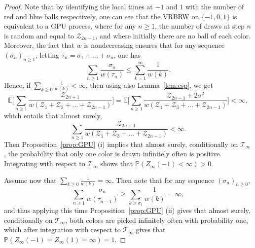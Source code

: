 \documentclass[10pt,a4paper]{amsart}
\newcommand{\1}{{\text{\Large $\mathfrak 1$}}}
\begin{document}
\begin{proof}
Note that by identifying the local times at $-1$ and $1$ with the number of red and blue balls respectively, one can see that the VRBRW on $\{-1,0,1\}$ is equivalent to a GPU process, where for any $n\ge 1$, the number of draws at step $n$ is random and equal to  $\mathcal Z_{2n-1}$, and where initially there are no ball of each color.  Moreover, the fact that $w$ is nondecreasing ensures that for any sequence $(\sigma_n)_{n\ge 1}$, letting $\tau_n = \sigma_1+\dots + \sigma_n$, one has 
$$\sum_{n\ge 1}\frac{\sigma_n}{w(\tau_n)} \le \sum_{k=1}^\infty \frac 1{w(k)}. $$ 
Hence, if $\sum_{k\ge 0} \frac 1{w(k)}<\infty$, then using also Lemma~\ref{lem:esp}, we get 
$$\mathbb E\Big[ \sum_{n\ge 1}\frac{\mathcal Z_{2n+1}}{w(\mathcal Z_1+\mathcal Z_3+ \dots + \mathcal Z_{2n-1} )}\Big] =
\mathbb E\Big[ \sum_{n\ge 1}\frac{\mathcal Z_{2n-1}+2 \sigma^2}{w(\mathcal Z_1+\mathcal Z_3+ \dots + \mathcal Z_{2n-1} )}\Big]   <\infty,$$ 
which entails that almost surely, 
$$\sum_{n\ge 1}\frac{\mathcal Z_{2n+1}}{w(\mathcal Z_1+\mathcal Z_3+ \dots + \mathcal Z_{2n-1} )}<\infty. $$ 
Then Proposition~\ref{prop:GPU} (i) implies that almost surely, conditionally on $\mathcal T_\infty$, the probability that only one color is drawn infinitely often is positive. Integrating with respect to $\mathcal T_\infty$ shows that $\mathbb P(Z_\infty(-1)<\infty) >0$. 


Assume now that $\sum_{k\ge 0} \frac 1{w(k)}= \infty$. Then note that for any sequence $(\sigma_n)_{n\ge 0}$, 
$$\sum_{n\ge 1}\frac{\sigma_n}{w(\tau_{n-1})} \ge \sum_{k\ge \sigma_1} \frac 1{w(k)}  = \infty,$$ 
and thus applying this time Proposition~\ref{prop:GPU} (ii) gives that almost surely, conditionally on $\mathcal T_\infty$, both colors are picked infinitely often with probability one, which after integration with respect to $\mathcal T_\infty$ gives that $\mathbb P(Z_\infty(-1) = Z_\infty(1) = \infty) = 1$. 
\end{proof}
\end{document}
